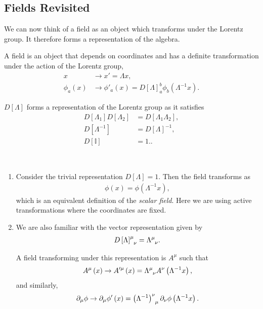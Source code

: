 \subsection{Fields Revisited}

We can now think of a field as an object which transforms under the Lorentz group. It therefore forms a representation of the algebra.

\begin{definition}
    A field is an object that depends on coordinates and has a definite transformation under the action of the Lorentz group,
    \begin{align}
        x & \to x' = \Lambda x, \\
        \phi_a \left( x \right) &\to \phi'_a \left( x \right) = D \left[ \Lambda \right]_{a}^{b} \phi_{b}\left( \Lambda^{-1} x \right) 
    .\end{align}
\end{definition}

$D \left[ \Lambda \right] $ forms a representation of the Lorentz group as it satisfies
\begin{align}
    D \left[ \Lambda_1 \right] D \left[ \Lambda_2 \right]  &= D \left[ \Lambda_1 \Lambda_2 \right], \\
    D \left[ \Lambda^{-1} \right] &= D \left[ \Lambda \right]^{-1}, \\
    D \left[ \mathbb{I} \right]  &= 1.
.\end{align}

\begin{examples}~
    \begin{enumerate}[label=\arabic*)]
        \item Consider the trivial representation $D \left[ \Lambda \right] = 1$. Then the field transforms as
\begin{align}
    \phi \left( x \right) = \phi \left( \Lambda^{-1} x \right) 
,\end{align}
which is an equivalent definition of the \textit{scalar field}. Here we are using active transformations where the coordinates are fixed.

    \item We are also familiar with the vector representation given by
        \begin{align}
            \tensor{D \left[ \Lambda \right] }{^{\mu}_{\nu}} = \tensor{\Lambda}{^{\mu}_{\nu}}
        .\end{align}

        A field transforming under this representation is $A^{\mu}$ such that
        \begin{align}
            A^{\mu}\left( x \right) \to A'^{\mu}\left( x \right)  = \tensor{\Lambda}{^{\mu}_{\nu}} A^{\nu} \left( \Lambda^{-1} x \right) 
        ,\end{align}
        and similarly,
        \begin{align}
            \partial_\mu \phi \to \partial_\mu \phi' \left( x \right) = \tensor{\left( \Lambda^{-1} \right)}{^{\nu}_\mu} \partial_\nu \phi \left( \Lambda^{-1} x \right) 
        .\end{align}
    \end{enumerate}
\end{examples}

